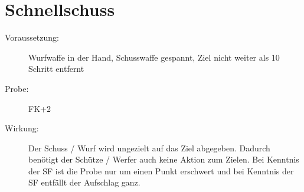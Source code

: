 \section{Schnellschuss}
\label{fkM.schnellschuss}
\begin{description}
    \item[Voraussetzung:]
        Wurfwaffe in der Hand, Schusswaffe gespannt, Ziel nicht weiter als 10 Schritt entfernt
    \item[Probe:]
        FK+2
    \item[Wirkung:]
        Der Schuss / Wurf wird ungezielt auf das Ziel abgegeben.
        Dadurch benötigt der Schütze / Werfer auch keine Aktion zum Zielen.
        Bei Kenntnis der SF  ist die Probe nur um einen Punkt erschwert und bei Kenntnis der SF  entfällt der Aufschlag ganz.
\end{description}
